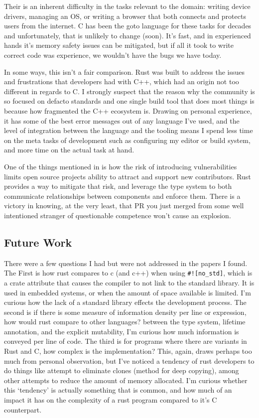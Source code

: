 \documentclass[conference]{IEEEtran}
\begin{document}
 {
  Their is an inherent difficulty in the tasks relevant to the domain: writing device drivers, managing an OS, or writing a browser that both connects and protects users from the internet.
  C has been the goto language for these tasks for decades and unfortunately, that is unlikely to change (soon).
  It's fast, and in experienced hands it's memory safety issues can be mitigated, but if all it took to write correct code was experience, we wouldn't have the bugs we have today.
 }

 {
  In some ways, this isn't a fair comparison. Rust was built to address the issues and frustrations that developers had with C++, which had an origin not too different in regards to C.
  I strongly suspect that the reason why the community is so focused on defacto standards and one single build tool that does most things is because how fragmented the C++ ecosystem is.
  Drawing on personal experience, it has some of the best error messages out of any language I've used, and the level of integration between the language and the tooling means I spend
  less time on the meta tasks of development such as configuring my editor or build system, and more time on the actual task at hand.
 }

 {
  One of the things mentioned in \cite{traceyGradingCurveHow2023} is how the risk of introducing vulnerabilities limits open source projects ability to attract and support new contributors.
  Rust provides a way to mitigate that risk, and leverage the type system to both communicate relationships between components and enforce them.
  There is a victory in knowing, at the very least, that PR you just merged from some well intentioned stranger of questionable competence won't cause an explosion.
 }

\subsection{Future Work}
{
There were a few questions I had but were not addressed in the papers I found. The First is how rust compares to c (and c++) when using \texttt{\#![no\_std]}, which is a crate attribute that causes the
compiler to not link to the standard library. It is used in embedded systems, or when the amount of space available is limited. I'm curious how the lack of a standard library effects
the development process. The second is if there is some measure of information density per line or expression, how would rust compare to other languages? between the type system, lifetime
annotation, and the explicit mutability, I'm curious how much information is conveyed per line of code. The third is for programs where there are variants in Rust and C, how complex is the
implementation? This, again, draws perhaps too much from personal observation, but I've noticed a tendency of rust developers to do things like attempt to eliminate clones (method for deep copying),
among other attempts to reduce the amount of memory allocated. I'm curious whether this `tendency' is actually something that is common, and how much of an impact it has on the complexity of
a rust program compared to it's C counterpart.
}



\end{document}
